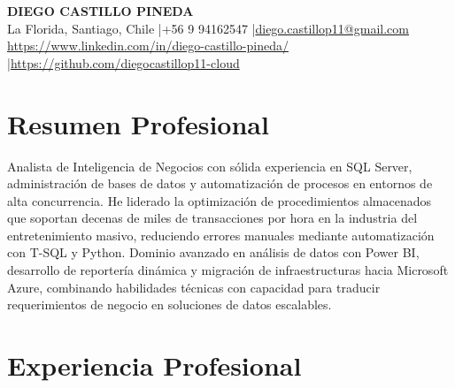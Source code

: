 \documentclass[11pt,letterpaper]{article}
\begin{document}
\begin{center}
{\fontsize{16}{19}\selectfont\textbf{\MakeUppercase{Diego Castillo Pineda}}}\\[4pt]
{\small La Florida, Santiago, Chile \quad|\quad +56 9 94162547 \quad|\quad \href{mailto:diego.castillop11@gmail.com}{diego.castillop11@gmail.com}\\
\href{https://https://www.linkedin.com/in/diego-castillo-pineda/}{https://www.linkedin.com/in/diego-castillo-pineda/} \quad|\quad \href{https://https://github.com/diegocastillop11-cloud}{https://github.com/diegocastillop11-cloud}}
\end{center}

\section{Resumen Profesional}
Analista de Inteligencia de Negocios con sólida experiencia en SQL Server, administración de bases de datos y automatización de procesos en entornos de alta concurrencia. He liderado la optimización de procedimientos almacenados que soportan decenas de miles de transacciones por hora en la industria del entretenimiento masivo, reduciendo errores manuales mediante automatización con T-SQL y Python. Dominio avanzado en análisis de datos con Power BI, desarrollo de reportería dinámica y migración de infraestructuras hacia Microsoft Azure, combinando habilidades técnicas con capacidad para traducir requerimientos de negocio en soluciones de datos escalables.

\section{Experiencia Profesional}
\end{document}
